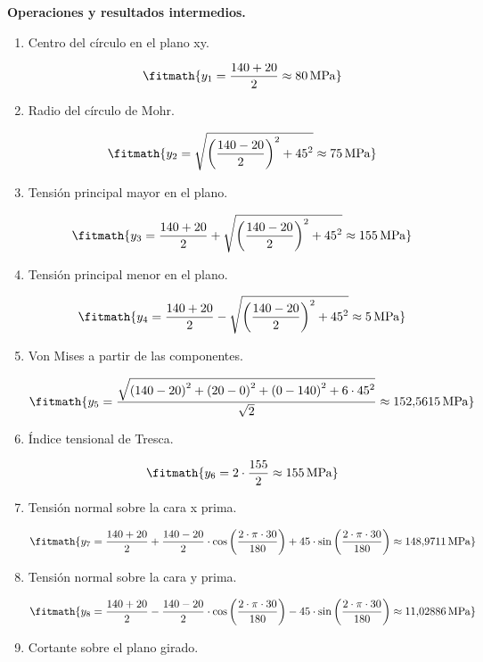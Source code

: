 \noindent\textbf{Operaciones y resultados intermedios.}

\begin{enumerate}

\item Centro del círculo en el plano xy.

\[\fitmath{y_{1}=\frac{140+20}{2}\approx 80\,\mathrm{MPa}}\]

\item Radio del círculo de Mohr.

\[\fitmath{y_{2}=\sqrt{{\left(\frac{140-20}{2}\right)}^{2}+{45}^{2}}\approx 75\,\mathrm{MPa}}\]

\item Tensión principal mayor en el plano.

\[\fitmath{y_{3}=\frac{140+20}{2}+\sqrt{{\left(\frac{140-20}{2}\right)}^{2}+{45}^{2}}\approx 155\,\mathrm{MPa}}\]

\item Tensión principal menor en el plano.

\[\fitmath{y_{4}=\frac{140+20}{2}-\sqrt{{\left(\frac{140-20}{2}\right)}^{2}+{45}^{2}}\approx 5\,\mathrm{MPa}}\]

\item Von Mises a partir de las componentes.

\[\fitmath{y_{5}=\frac{\sqrt{{\left(140-20\right)}^{2}+{\left(20-0\right)}^{2}+{\left(0-140\right)}^{2}+6\cdot {45}^{2}}}{\sqrt{2}}\approx 152{,}5615\,\mathrm{MPa}}\]

\item Índice tensional de Tresca.

\[\fitmath{y_{6}=2\cdot \frac{155}{2}\approx 155\,\mathrm{MPa}}\]

\item Tensión normal sobre la cara x prima.

\[\fitmath{y_{7}=\frac{140+20}{2}+\frac{140-20}{2}\cdot \cos\left(\frac{2\cdot \pi\cdot 30}{180}\right)+45\cdot \sin\left(\frac{2\cdot \pi\cdot 30}{180}\right)\approx 148{,}9711\,\mathrm{MPa}}\]

\item Tensión normal sobre la cara y prima.

\[\fitmath{y_{8}=\frac{140+20}{2}-\frac{140-20}{2}\cdot \cos\left(\frac{2\cdot \pi\cdot 30}{180}\right)-45\cdot \sin\left(\frac{2\cdot \pi\cdot 30}{180}\right)\approx 11{,}02886\,\mathrm{MPa}}\]

\item Cortante sobre el plano girado.


\end{enumerate}
